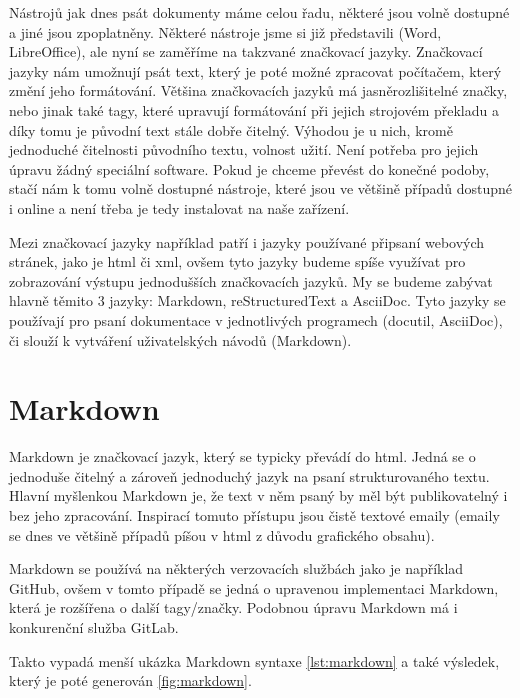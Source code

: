 Nástrojů jak dnes psát dokumenty máme celou řadu, některé jsou volně dostupné a jiné jsou zpoplatněny. Některé nástroje jsme si již představili (Word, LibreOffice), ale
nyní se zaměříme na takzvané značkovací jazyky. Značkovací jazyky nám umožnují psát text, který je poté možné zpracovat počítačem, který změní jeho formátování. Většina
značkovacích jazyků má jasně\linebreak rozlišitelné značky, nebo jinak také tagy, které upravují formátování při jejich strojovém překladu a díky tomu je původní text stále dobře čitelný.
\cite{markup} Výhodou je u nich, kromě jednoduché čitelnosti původního textu, volnost užití. Není potřeba pro jejich úpravu žádný speciální software. Pokud je chceme převést do
konečné podoby, stačí nám k tomu volně dostupné nástroje, které jsou ve většině případů dostupné i online a není třeba je tedy instalovat na naše zařízení.

Mezi značkovací jazyky například patří i jazyky používané při\linebreak psaní webových stránek, jako je \gls{html} či \gls{xml}, ovšem tyto jazyky budeme spíše využívat pro zobrazování výstupu
jednodušších značkovacích jazyků. My se budeme zabývat hlavně těmito 3 jazyky: Markdown, reStructuredText a AsciiDoc. Tyto jazyky se používají pro psaní dokumentace v jednotlivých programech
(docutil, AsciiDoc), či slouží k vytváření uživatelských návodů (Markdown).

\clearpage

\section{Markdown}

Markdown je značkovací jazyk, který se typicky převádí do \gls{html}. Jedná se o jednoduše čitelný a zároveň jednoduchý jazyk na psaní strukturovaného textu. Hlavní myšlenkou Markdown je, že
text v něm psaný by měl být publikovatelný i bez jeho zpracování. Inspirací tomuto přístupu jsou čistě textové emaily (emaily se dnes ve většině případů píšou v \gls{html}
z důvodu grafického obsahu). \cite{markdown}

Markdown se používá na některých verzovacích službách jako je například GitHub, ovšem v tomto případě se jedná o upravenou implementaci Markdown, která je rozšířena o další
tagy/značky. Podobnou úpravu Markdown má i konkurenční služba GitLab.

Takto vypadá menší ukázka Markdown syntaxe \ref{lst:markdown} a také výsledek, který je poté generován \ref{fig:markdown}.

